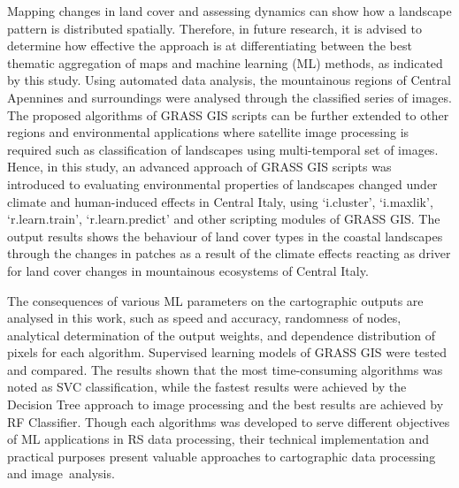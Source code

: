 \documentclass[jimaging,article,accept,pdftex,oneauthor]{Definitions/mdpi}
\begin{document}
Mapping changes in land cover and assessing dynamics can show how a landscape pattern is distributed spatially. Therefore, in future  research, it is advised to determine how effective the approach is at differentiating between the best thematic aggregation of maps and machine learning (ML) methods, as indicated by this study. Using automated data analysis, the mountainous regions of Central Apennines and surroundings were analysed through the classified series of images. The proposed algorithms of GRASS GIS scripts can be further extended to other regions and environmental applications where satellite image processing is required such as classification of landscapes using multi-temporal set of images. Hence, in this study, an advanced approach of GRASS GIS scripts was  introduced to evaluating environmental properties of landscapes changed under climate and human-induced effects in Central Italy, using `i.cluster', `i.maxlik', `r.learn.train', `r.learn.predict' and other scripting modules of GRASS GIS. The output results shows the behaviour of land cover types in the coastal landscapes through the changes in patches as a result of the climate effects reacting as driver for land cover changes in mountainous ecosystems of Central Italy. 

The consequences of various ML parameters on the cartographic outputs are analysed in this work, such as speed and accuracy, randomness of nodes, analytical determination of the output weights, and dependence distribution of pixels for each algorithm. Supervised learning models of GRASS GIS were tested and compared. The results shown that the most time-consuming algorithms was noted as SVC classification, while the fastest results were achieved by the Decision Tree approach to image processing and the best results are achieved by RF Classifier. Though each algorithms was developed to serve different objectives of ML applications in RS data processing, their technical implementation and practical purposes present valuable approaches to cartographic data processing and image~analysis. %

\vspace{6pt}


\end{document}
